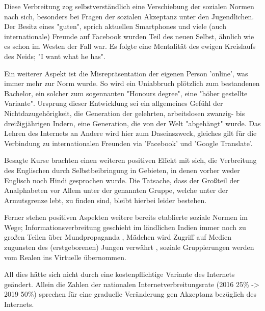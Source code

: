 \documentclass{article}
\begin{document}
\medskip

Diese Verbreitung zog selbstverständlich eine Verschiebung der sozialen Normen nach sich, besonders bei Fragen der sozialen Akzeptanz unter den Jugendlichen. Der Besitz eines "guten", sprich aktuellen Smartphones und viele (auch internationale) Freunde auf Facebook wurden Teil des neuen Selbst, ähnlich wie es schon im Westen der Fall war. Es folgte eine Mentalität des ewigen Kreislaufs des Neids; "I want what he has". \cite{empowermentThroughFacebook}

\medskip

 Ein weiterer Aspekt ist die Misrepräsentation der eigenen Person 'online', was immer mehr zur Norm wurde. So wird ein Uniabbruch plötzlich zum bestandenen Bachelor, ein solcher zum sogennanten "Honours degree", eine "höher gestellte Variante". Ursprung dieser Entwicklung sei ein allgemeines Gefühl der Nichtdazugehörigkeit, die Generation der gelehrten, arbeitslosen zwanzig- bis dreißigjährigen Indern, eine Generation, die von der Welt "abgehängt" wurde. Das Lehren des Internets an Andere wird hier zum Daseinszweck, gleiches gilt für die Verbindung zu internationalen Freunden via 'Facebook' und 'Google Translate'. \cite{empowermentThroughFacebook}

\medskip

Besagte Kurse brachten einen weiteren positiven Effekt mit sich, die Verbreitung des Englischen durch Selbstbeibringung in Gebieten, in denen vorher weder Englisch noch Hindi gesprochen wurde. \cite{empowermentThroughFacebook} Die Tatsache, dass der Großteil der Analphabeten vor Allem unter der genannten Gruppe, welche unter der Armutsgrenze lebt, zu finden sind, bleibt hierbei leider bestehen.

\medskip

Ferner stehen positiven Aspekten weitere bereits etablierte soziale Normen im Wege; Informationsverbreitung geschieht im ländlichen Indien immer noch zu großen Teilen über Mundpropaganda \cite[259]{everydayLife}, Mädchen wird Zugriff auf Medien zugunsten des (erstgeborenen) Jungen verwährt \cite{empowermentThroughFacebook}, soziale Gruppierungen werden vom Realen ins Virtuelle übernommen.

\medskip

All dies hätte sich nicht durch eine kostenpflichtige Variante des Internets geändert. Allein die Zahlen der nationalen Internetverbreitungsrate (2016 25\% \--> 2019 50\%) sprechen für eine graduelle Veränderung gen Akzeptanz bezüglich des Internets. %

\parencite[Vgl.]{prasad2017}
\parencite{digitYT}
\parencite{ndtvYT}
\end{document}
